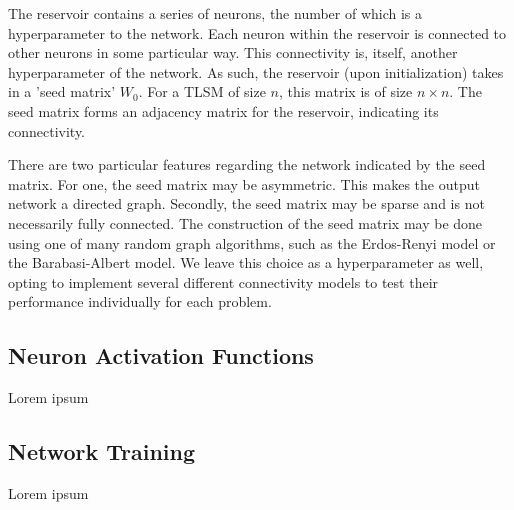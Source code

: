 The reservoir contains a series of neurons, the number of which is a
hyperparameter to the network. Each neuron within the reservoir is connected to
other neurons in some particular way. This connectivity is, itself, another
hyperparameter of the network. As such, the reservoir (upon initialization)
takes in a 'seed matrix' $W_0$. For a TLSM of size $n$, this matrix is of size
$n\times n$. The seed matrix forms an adjacency matrix for the reservoir,
indicating its connectivity.

There are two particular features regarding the network indicated by the seed
matrix. For one, the seed matrix may be asymmetric. This makes the output
network a directed graph. Secondly, the seed matrix may be sparse and is not
necessarily fully connected. The construction of the seed matrix may be done
using one of many random graph algorithms, such as the Erdos-Renyi model or the
Barabasi-Albert model. We leave this choice as a hyperparameter as well, opting
to implement several different connectivity models to test their performance
individually for each problem.

\subsection{Neuron Activation Functions}

Lorem ipsum

\subsection{Network Training}

Lorem ipsum